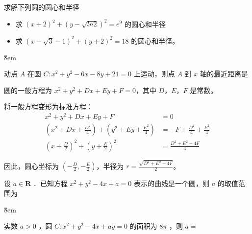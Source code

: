 \begin{example}
    求解下列圆的圆心和半径
    \begin{itemize}
        \item 求 $(x+2)^2+(y-\sqrt{ln2})^2=e^9$ 的圆心和半径
        \item 求 $(x-\sqrt{3}-1)^2+(y+2)^2=18$ 的圆心和半径。
    \end{itemize}

\end{example}

\v{8em}

\begin{example}
    动点 $A$ 在圆 $C: x^2+y^2-6 x-8 y+21=0$ 上运动，则点 $A$ 到 $x$ 轴的最近距离是 \underline{\qquad}
\end{example}

\begin{definition}[圆的一般方程]
    圆的一般方程为 $x^2+y^2+Dx+Ey+F=0$，其中 $D$，$E$，$F$ 是常数。

    将一般方程变形为标准方程：
    \begin{align}
        x^2+y^2+Dx+Ey+F                                                       & = 0                              \\
        \left(x^2+Dx+\frac{D^2}{4}\right) + \left(y^2+Ey+\frac{E^2}{4}\right) & = -F+\frac{D^2}{4}+\frac{E^2}{4} \\
        \left(x+\frac{D}{2}\right)^2 + \left(y+\frac{E}{2}\right)^2           & = \frac{D^2+E^2-4F}{4}
    \end{align}

    因此，圆心坐标为 $\left(-\frac{D}{2}, -\frac{E}{2}\right)$，半径为 $r = \frac{\sqrt{D^2+E^2-4F}}{2}$。
\end{definition}

\begin{example}
    设 $a \in \mathbf{R}$ ．已知方程 $x^2+y^2-4 x+a=0$ 表示的曲线是一个圆，则 $a$ 的取值范围为 \underline{\qquad}
\end{example}

\v{8em}

\begin{example}
    实数 $a>0$ ，圆 $C: x^2+y^2-4 x+a y=0$ 的面积为 $8 \pi$ ，则 $a=$ \underline{\qquad}
\end{example}

